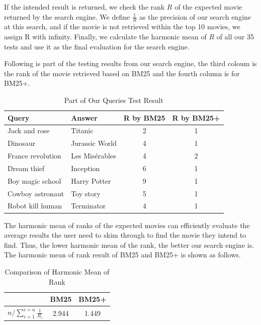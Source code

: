 \documentclass[sigconf,nonacm]{acmart}
\begin{document}
If the intended result is returned, we check the rank $R$ of the expected movie returned by the search
engine.
We define $\frac{1}{R}$ as the precision of our search engine at this search, and if the movie is not retrieved within the top 10 movies, we assign R with infinity.
Finally, we calculate the harmonic mean of $R$ of all our 35 tests and use it as the final evaluation for
the search engine.

Following is part of the testing results from our search engine, the third coloum
is the rank of the movie retrieved based on BM25 and the fourth
column is for BM25+.


\begin{table}[H]
  \caption{Part of Our Queries Test Result}
  \label{tab:query_result}
  \begin{tabular}{llcc}
    \toprule
    Query             & Answer         & R by BM25 & R by BM25+ \\
    \midrule
    Jack and rose     & Titanic        & 2         & 1          \\
    Dinosaur          & Jurassic World & 4         & 1          \\
    France revolution & Les Misérables & 4         & 2          \\
    Dream thief       & Inception      & 6         & 1          \\
    Boy magic school  & Harry Potter   & 9         & 1          \\
    Cowboy astronaut  & Toy story      & 5         & 1          \\
    Robot kill human  & Terminator     & 4         & 1          \\
    \bottomrule
  \end{tabular}
\end{table}

The harmonic mean of ranks of the expected movies can efficiently evaluate the average
results the user need to skim through to find the movie they intend to find.
Thus, the lower harmonic mean of the rank, the better our search engine is.
The harmonic mean of rank result of BM25 and BM25+ is shown as follows.


\begin{table}[H]
  \caption{Comparison of Harmonic Mean of Rank }
  \begin{tabular}{ c  c c}
    \toprule
                                              & BM25  & BM25+ \\
    \midrule
    $ n / \sum_{i=1}^{i=n} \frac{1}{R_{i}}  $ & 2.944 & 1.449 \\
    \bottomrule
  \end{tabular}
\end{table}
\end{document}
